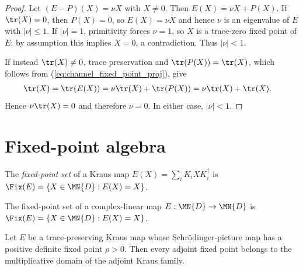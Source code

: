 \begin{proof}
    \leanok
    Let $(E-P)(X)=\nu X$ with $X\neq0$. Then
    $E(X)=\nu X+P(X)$. If $\tr(X)=0$, then $P(X)=0$, so
    $E(X)=\nu X$ and hence $\nu$ is an eigenvalue of $E$ with
    $|\nu|\le1$. If $|\nu|=1$, primitivity forces $\nu=1$, so $X$ is a
    trace-zero fixed point of $E$; by assumption this implies $X=0$, a
    contradiction. Thus $|\nu|<1$.

    If instead $\tr(X)\neq0$, trace preservation and
    $\tr(P(X))=\tr(X)$, which follows from
    (\ref{eq:channel_fixed_point_proj}), give
    \begin{align}
        \tr(X)
         & =\tr(E(X))
        =\nu\tr(X)+\tr(P(X))
        =\nu\tr(X)+\tr(X).
        \notag
    \end{align}
    Hence $\nu\tr(X)=0$ and therefore $\nu=0$. In either case,
    $|\nu|<1$.
\end{proof}

\section{Fixed-point algebra}
\label{sec:fixed_point_algebra}

\begin{definition}\label{def:kraus_fixed_points}
    \leanok
    The \emph{fixed-point set} of a Kraus map
    $E(X)=\sum_iK_iXK_i^\dagger$ is
    $\Fix(E)=\{X\in\MN{D}:E(X)=X\}$.
\end{definition}

\begin{definition}\label{def:abstract_fixed_points}
    \leanok
    The fixed-point set of a complex-linear map
    $E:\MN{D}\to\MN{D}$ is $\Fix(E)=\{X\in\MN{D}:E(X)=X\}$.
\end{definition}

\begin{theorem}
    \label{thm:fixedPoints_in_multiplicativeDomain}
    \leanok
    Let $E$ be a trace-preserving Kraus map whose Schr{\"o}dinger-picture map has a
    positive definite fixed point $\rho>0$.
    Then every adjoint fixed point belongs to the multiplicative domain of the
    adjoint Kraus family.
\end{theorem}

